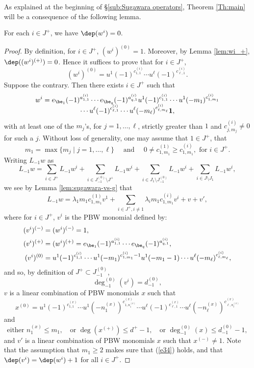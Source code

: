 As explained at the beginning of \S\ref{sub:Sugawara operators}, Theorem
\ref{Th:main} will be a consequence of the following lemma.

\begin{lem}
\label{lem:w_0}
For each $i\in J^+$, we have $\dep(w^{i})=0$.
\end{lem}
\begin{proof}
By definition, for $i\in J^+$, $(w^i)^{(0)}=1$. Moreover, by Lemma \ref{lem:wi_+},
$\dep((w^i)^{(+)})=0$. Hence it suffices to prove that for $i\in J^+$,
\[
(w^{i})^{(0)}=u^{1}(-1)^{c^{(i)}_{1,1}}\cdots u^\ell (-1)^{c^{(i)}_{\ell,1}}.
\]
Suppose the contrary. Then
there exists $i \in J^+$ such that
\begin{multline*}
w^i = e_{\be_1}(-1)^{a^{(i)}_{1,1}}\cdots e_{\be_{q}}(-1)^{a^{(i)}_{q,1}} u^{1}(-1)^{c^{(i)}_{1,1}}
\cdots u^{1}(-m_{1})^{c^{(i)}_{1,m_1}} \\[-5pt]
\cdots u^\ell (-1)^{c^{(i)}_{\ell,1}} \cdots u^\ell(-m_{\ell})^{c^{(i)}_{\ell,m_\ell}} \mathbf{1},
\end{multline*}
with at least one of the $m_j$'s, for $j=1,\dots,\ell$, strictly greater than $1$
and $c^{(i)}_{j,m_j} \not=0$ for such a $j$.
Without loss of generality,
one may assume that $1 \in J^+$, that
\[
m_1=\max\{ m_j\mid j=1,\dots,\ell\} \quad \text{ and }
\quad 0\neq c^{(1)}_{1,m_1} \geq c^{(i)}_{1,m_1}, \text{ for } i\in J^+.
\]
Writing $L_{-1}w$ as
\[
L_{-1}w=\sum_{i \in J^+ }L_{-1}w^i
+\sum_{i\in J_{-1}^{(0)}\setminus J^+}L_{-1}w^i
+\sum_{i\in J_1\setminus J_{-1}^{(0)}}L_{-1}w^i
+\sum_{i \in J \setminus J_1}L_{-1}w^i,
\]
we see by Lemma \ref{lem:sugawara-vs-g} that
\begin{equation}\label{e17}
L_{-1}w=\lambda_1 m_1c^{(1)}_{1,m_1} v^1+\sum_{i\in J^+,i\neq 1}\lambda_im_1c^{(i)}_{1,m_1}v^i+v
+v',
\end{equation}
where for $i\in J^+$, $v^{i}$ is the PBW monomial defined by:
\begin{align}\label{e14}
(v^i)^{(-)}&=(w^i)^{(-)}=1,
\\
\label{e13}
(v^i)^{(+)}&=(w^i)^{(+)}=e_{\be_1}(-1)^{a^{(i)}_{1,1}}\cdots e_{\be_{q}}(-1)^{a^{(i)}_{q,1}},
\\
\label{e33}
(v^i)^{(0)} & = u^{1}(-1)^{c^{(i)}_{1,1}}\cdots
u^{1}(-m_{1})^{c^{(i)}_{1,m_1}-1}u^{1}(-m_{1}-1)\cdots u^\ell (-m_{\ell})^{c^{(i)}_{\ell,m_\ell}},
\end{align}
and so, by definition of $J^+ \subset J_{-1}^{(0)}$,
\begin{equation}\label{e34}
\deg_{-1}^{(0)}(v^i)=d_{-1}^{(0)},
\end{equation}
$v$ is a linear combination of PBW monomials $x$ such that
\[
x^{(0)}=u^{1}(-1)^{c^{(x)}_{1,1}}\cdots u^{1}(- n_{1}^{(x)})^{c^{(x)}_{1,n_{1}^{(x)}}}
\cdots u^\ell (-1)^{c^{(x)}_{\ell,1}}\cdots u^\ell(-n_{\ell}^{(x)})^{c^{(x)}_{\ell,n_{\ell}^{(x)}}}
\]
and
\[
\text{either } n_{1}^{(x)}\leq m_1,\quad
\text{or }
\deg(x^{(+)})\leq d^+ -1,\quad
\text{or }
\deg_{-1}^{(0)}(x)\leq d_{-1}^{(0)}-1,
\]
and $v'$ is a linear combination of PBW monomials $x$ such that $x^{(-)}\neq 1$.
Note that the assumption that $m_1\geq 2$ makes sure that (\ref{e34}) holds,
and that $\dep(v^{i}) =\dep(w^i)+1$ for all $i \in J^+$.


\end{proof}
